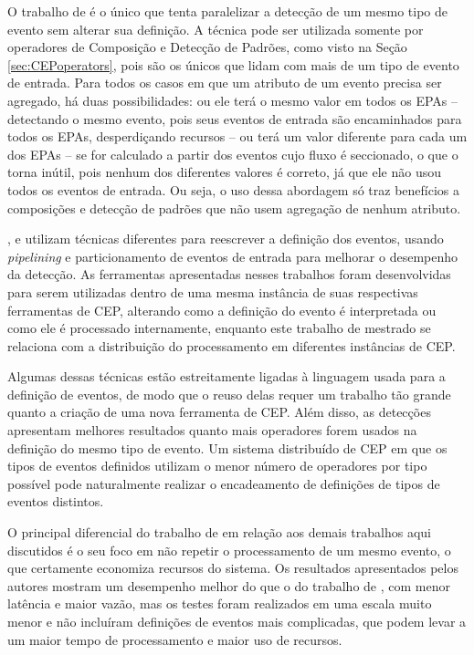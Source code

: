 O trabalho de \cite{doi:10.1177/1550147717728626} é o único que tenta paralelizar a detecção de um mesmo tipo de evento sem alterar sua definição. A técnica pode ser utilizada somente por operadores de Composição e Detecção de Padrões, como visto na Seção \ref{sec:CEPoperators}, pois são os únicos que lidam com mais de um tipo de evento de entrada. Para todos os casos em que um atributo de um evento precisa ser agregado, há duas possibilidades: ou ele terá o mesmo valor em todos os EPAs – detectando o mesmo evento, pois seus eventos de entrada são encaminhados para todos os EPAs, desperdiçando recursos – ou terá um valor diferente para cada um dos EPAs – se for calculado a partir dos eventos cujo fluxo é seccionado, o que o torna inútil, pois nenhum dos diferentes valores é correto, já que ele não usou todos os eventos de entrada. Ou seja, o uso dessa abordagem só traz benefícios a composições e detecção de padrões que não usem agregação de nenhum atributo.

\cite{JAYASEKARA201542}, \cite{Schultz-Moller:2009:DCE:1619258.1619264} e \cite{Balkesen:2013:RRI:2488222.2488257} utilizam técnicas diferentes para reescrever a definição dos eventos, usando \textit{pipelining} e particionamento de eventos de entrada para melhorar o desempenho da detecção. 
As ferramentas apresentadas nesses trabalhos foram desenvolvidas para serem utilizadas dentro de uma mesma instância de suas respectivas ferramentas de CEP, alterando como a definição do evento é interpretada ou como ele é processado internamente, enquanto este trabalho de mestrado se relaciona com a distribuição do processamento em diferentes instâncias de CEP.

Algumas dessas técnicas %
 estão estreitamente ligadas à linguagem usada para a definição de eventos, de modo que o reuso delas requer um trabalho tão grande quanto a criação de uma nova ferramenta de CEP. Além disso, as detecções apresentam melhores resultados quanto mais operadores forem usados na definição do mesmo tipo de evento.
Um sistema distribuído de CEP em que os tipos de eventos definidos utilizam o menor número de operadores por tipo possível pode naturalmente realizar o encadeamento de definições de tipos de eventos distintos. 

O principal diferencial do trabalho de \cite{7129184} em relação aos demais trabalhos aqui discutidos é o seu foco em não repetir o processamento de um mesmo evento, o que certamente economiza recursos do sistema. Os resultados apresentados pelos autores mostram um desempenho melhor do que o do trabalho de \cite{Isoyama:2012:SCE:2335484.2335498}, com menor latência e maior vazão, mas os testes foram realizados em uma escala muito menor e não incluíram definições de eventos mais complicadas, que podem levar a um maior tempo de processamento e maior uso de recursos. 

